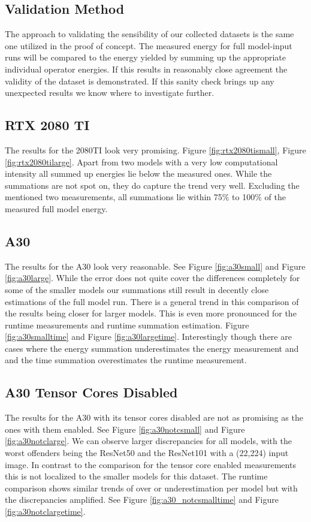 \documentclass[conference]{IEEEtran}
\begin{document}
\subsection{Validation Method}
The approach to validating the sensibility of our collected datasets is the same one utilized in the proof of concept. The measured energy for full model-input runs will be compared to the energy yielded by summing up the appropriate individual operator energies. If this results in reasonably close agreement the validity of the dataset is demonstrated. If this sanity check brings up any unexpected results we know where to investigate further.


\subsection{RTX 2080 TI}
The results for the 2080TI look very promising. Figure \ref{fig:rtx2080tismall}, Figure \ref{fig:rtx2080tilarge}. Apart from two models with a very low computational intensity all summed up energies lie below the measured ones. While the summations are not spot on, they do capture the trend very well. Excluding the mentioned two measurements, all summations lie within 75\% to 100\% of the measured full model energy.


\subsection{A30}
The results for the A30 look very reasonable. See Figure \ref{fig:a30small} and Figure \ref{fig:a30large}. While the error does not quite cover the differences completely for some of the smaller models our summations still result in decently close estimations of the full model run. There is a general trend in this comparison of the results being closer for larger models. This is even more pronounced for the runtime measurements and runtime summation estimation. Figure \ref{fig:a30smalltime} and Figure \ref{fig:a30largetime}. Interestingly though there are cases where the energy summation underestimates the energy measurement and and the time summation overestimates the runtime measurement.


\subsection{A30 Tensor Cores Disabled}
The results for the A30 with its tensor cores disabled are not as promising as the ones with them enabled. See Figure \ref{fig:a30notcsmall} and Figure \ref{fig:a30notclarge}. We can observe larger discrepancies for all models, with the worst offenders being the ResNet50 and the ResNet101 with a (22,224) input image. In contrast to the comparison for the tensor core enabled measurements this is not localized to the smaller models for this dataset. The runtime comparison shows similar trends of over or underestimation per model but with the discrepancies amplified. See Figure 
\ref{fig:a30_notcsmalltime} and Figure \ref{fig:a30notclargetime}.
\end{document}
